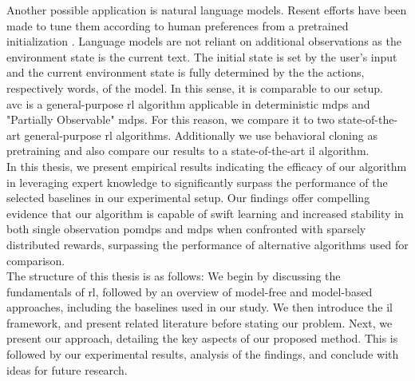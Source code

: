 Another possible application is natural language models. Resent efforts have been made to tune 
them according to human preferences from a pretrained initialization \cite{cite:ChatGPT}. Language models are not reliant on additional observations as the environment state is the current 
text. The initial state is set by the user's input and the current environment state is fully determined by the the actions, respectively words, of the model. 
In this sense, it is comparable to our setup.\\


\ac{avc} is a general-purpose \ac{rl} algorithm applicable in deterministic \ac{mdp}s and "Partially Observable" \ac{mdp}s. 
For this reason, we compare it to two state-of-the-art general-purpose \ac{rl} algorithms. Additionally we use behavioral cloning as pretraining  
and also compare our results to a state-of-the-art \ac{il} algorithm.\\

In this thesis, we present empirical results indicating the efficacy of our algorithm in leveraging expert knowledge to significantly surpass the performance of the selected baselines in our 
experimental setup. Our findings offer compelling evidence that our algorithm is capable of swift learning and increased stability in both single observation \ac{pomdp}s and \ac{mdp}s when confronted with 
sparsely distributed rewards, surpassing the performance of alternative algorithms used for comparison.\\

The structure of this thesis is as follows: We begin by discussing the fundamentals of \ac{rl}, followed by an overview of model-free and model-based approaches, 
including the baselines used in our study. We then introduce the \ac{il} framework, and present related literature before stating our problem. 
Next, we present our approach, detailing the key aspects of our proposed method. This is followed by our experimental results, analysis of the findings, and conclude with ideas for future research.
